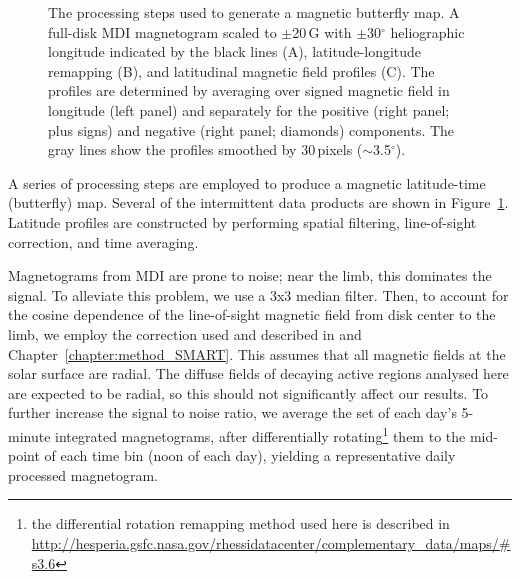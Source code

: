 \begin{figure}[!t]
\caption[The processing steps used to generate a butterfly map.]{The processing steps used to generate a magnetic butterfly map. A full-disk MDI magnetogram scaled to $\pm$20\,G with $\pm$30$^{\circ}$ heliographic longitude indicated by the black lines (A), latitude-longitude remapping (B), and latitudinal magnetic field profiles (C). The profiles are determined by averaging over signed magnetic field in longitude (left panel) and separately for the positive (right panel; plus signs) and negative (right panel; diamonds) components. The gray lines show the profiles smoothed by 30\,pixels ($\sim$3.5$^{\circ}$).}
   \label{fig:butterflymethod}
\end{figure}


A series of processing steps are employed to produce a magnetic latitude-time (butterfly) map. Several of the intermittent data products are shown in Figure~\ref{fig:butterflymethod}. Latitude profiles are constructed by performing spatial filtering, line-of-sight correction, and time averaging. 

Magnetograms from MDI are prone to noise; near the limb, this dominates the signal. To alleviate this problem, we use a 3x3 median filter. Then, to account for the cosine dependence of the line-of-sight magnetic field from disk center to the limb, we employ the correction used and described in \cite{higgins:2011} and Chapter~\ref{chapter:method_SMART}. This assumes that all magnetic fields at the solar surface are radial. The diffuse fields of decaying active regions analysed here are expected to be radial, so this should not significantly affect our results. To further increase the signal to noise ratio, we average the set of each day's 5-minute integrated magnetograms, after differentially rotating\footnote{the differential rotation remapping method used here is described in \url{http://hesperia.gsfc.nasa.gov/rhessidatacenter/complementary_data/maps/\#s3.6}} them to the mid-point of each time bin (noon of each day), yielding a representative daily processed magnetogram. 

